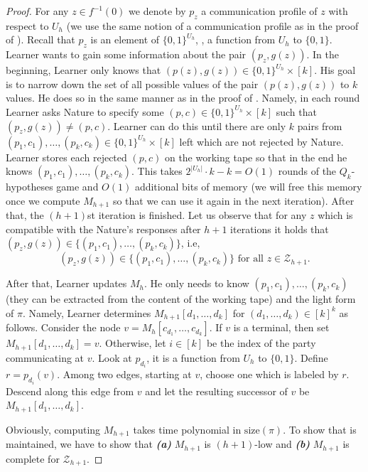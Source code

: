 \documentclass{toc}
\begin{document}
\begin{proof}
For any $z\in f^{-1}(0)$ we denote by $p_z$  a communication profile of $z$ with respect to $U_h$ (we use the same notion of a communication profile as in the proof of ). Recall that $p_z$ is an element of $\{0, 1\}^{U_h}$, \ie, a function from $U_h$ to $\{0, 1\}$. Learner wants to gain some information about the pair $(p_z, g(z))$. In the beginning, Learner only knows that $(p(z), g(z)) \in \{0,1\}^{U_h}\times[k]$. His goal is to narrow down the set of all possible values of the pair $(p(z), g(z))$ to $k$ values. 
%
 He does so in the same manner as in the proof of .  %
Namely, in each round Learner asks Nature to specify some $(p, c)\in \{0,1\}^{U_h}\times[k]$ such that $(p_z, g(z)) \neq (p, c)$. Learner can do this until there are only $k$ pairs from $(p_1, c_1), \ldots, (p_k, c_k)\in \{0, 1\}^{U_h} \times [k]$ left which are not rejected by Nature. Learner stores each rejected $(p, c)$ on the working tape so that in the end he knows $(p_1, c_1), \ldots, (p_k, c_k)$.  %
 This takes $2^{|U_h|} \cdot k - k = O(1)$ rounds of the $Q_k$-hypotheses game and $O(1)$ additional bits of memory (we will free this memory once we compute $M_{h+1}$ so that we can use it again in the next iteration). After that, the $(h+1)$st iteration is finished. Let us observe that for any $z$ which is compatible with the Nature's responses after $h + 1$ iterations it holds that $(p_z, g(z)) \in\{(p_1, c_1), \ldots, (p_k, c_k)\}$, i.e,   
\begin{equation}
\label{h_equation}
(p_z, g(z)) \in \{(p_1, c_1), \ldots, (p_k, c_k)\} \mbox{ for all } z\in\mathcal{Z}_{h + 1}.
\end{equation}

After that, Learner updates $M_h$. He only needs to know $(p_1, c_1), \ldots, (p_k, c_k)$ (they can be extracted from the content of the working tape) and the light form of $\pi$. Namely, Learner determines $M_{h + 1}[d_1, \ldots, d_k]$ for $(d_1, \ldots, d_k) \in [k]^k$ as follows. Consider the node $v = M_h[c_{d_1}, \ldots, c_{d_k}]$. If $v$ is a terminal, then set $M_{h + 1}[d_1, \ldots, d_k] = v$. Otherwise, let $i\in [k]$ be the index of the party communicating at $v$. Look at $p_{d_i}$, it is a function from $U_h$ to $\{0, 1\}$. Define $r = p_{d_i}(v)$. Among two edges, starting at $v$, choose one which is labeled by $r$. Descend along this edge from $v$ and let the resulting successor of $v$ be $M_{h + 1}[d_1, \ldots, d_k]$.

Obviously, computing $M_{h + 1}$ takes time polynomial in $\mathrm{size}(\pi)$.
To show that  is maintained, we have to show that \textbf{\emph{(a)}} $M_{h + 1}$ is $(h + 1)$-low and \textbf{\emph{(b)}} $M_{h + 1}$ is complete for $\mathcal{Z}_{h + 1}$.


\end{proof}
\end{document}
